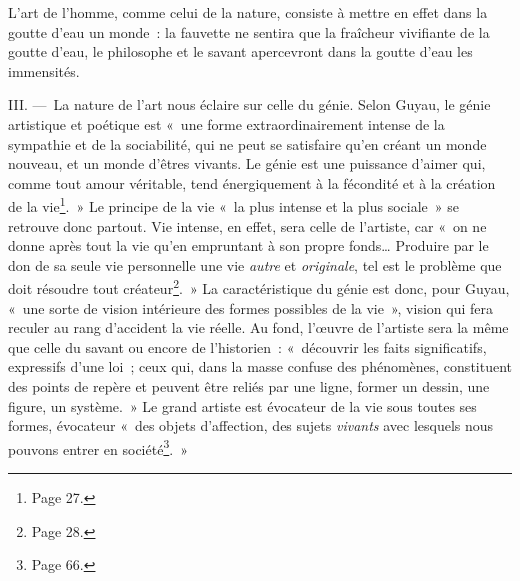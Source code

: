 \documentclass[french,twoside]{book} %
\begin{document}
\noindent L’art de l’homme, comme celui de la nature, consiste à mettre en effet dans la goutte d’eau un monde : la fauvette ne sentira que la fraîcheur vivifiante de la goutte d’eau, le philosophe et le savant apercevront dans la goutte d’eau les immensités.\par
III. — La nature de l’art nous éclaire sur celle du génie. Selon Guyau, le génie artistique et poétique est « une forme extraordinairement intense de la sympathie et de la sociabilité, qui ne peut se satisfaire qu’en créant un monde nouveau, et un monde d’êtres vivants. Le génie est une puissance d’aimer qui, comme tout amour véritable, tend énergiquement à la fécondité et à la création de la vie\footnote{Page 27.}. » Le principe de la vie « la plus intense et la plus sociale » se retrouve donc partout. Vie intense, en effet, sera celle de l’artiste, car « on ne donne après tout la vie qu’en empruntant à son propre fonds… Produire par le don de sa seule vie personnelle une vie \emph{autre} et \emph{originale}, tel est le problème que doit résoudre tout créateur\footnote{Page 28.}. » La caractéristique du génie est donc, pour Guyau, « une sorte de vision intérieure des formes possibles de la vie », vision qui fera reculer au rang d’accident la vie réelle. Au fond, l’œuvre de l’artiste sera la même que celle du savant ou encore de l’historien : « découvrir les faits significatifs, expressifs d’une loi ; ceux qui, dans la masse confuse des phénomènes, constituent des points de repère et peuvent être reliés par une ligne, former un dessin, une figure, un système. » Le grand artiste est évocateur de la vie sous toutes ses formes, évocateur « des objets d’affection, des sujets \emph{vivants} avec lesquels nous pouvons entrer en société\footnote{Page 66.}. »\par
\end{document}

